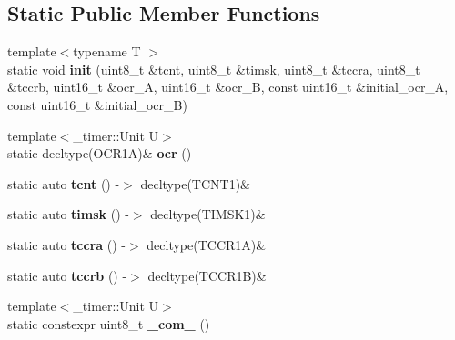 \subsection*{Static Public Member Functions}
\begin{DoxyCompactItemize}
\item 
{\footnotesize template$<$typename T $>$ }\\static void {\bfseries init} (uint8\+\_\+t \&tcnt, uint8\+\_\+t \&timsk, uint8\+\_\+t \&tccra, uint8\+\_\+t \&tccrb, uint16\+\_\+t \&ocr\+\_\+A, uint16\+\_\+t \&ocr\+\_\+B, const uint16\+\_\+t \&initial\+\_\+ocr\+\_\+A, const uint16\+\_\+t \&initial\+\_\+ocr\+\_\+B)\hypertarget{struct__timer1_1_1TimerDef_a3f8c9827b8d6cf2ba3cc058f9755f9c9}{}\label{struct__timer1_1_1TimerDef_a3f8c9827b8d6cf2ba3cc058f9755f9c9}

\item 
{\footnotesize template$<$\+\_\+timer\+::\+Unit U$>$ }\\static decltype(O\+C\+R1A)\& {\bfseries ocr} ()\hypertarget{struct__timer1_1_1TimerDef_af3e2a25d73a3c8af06c8328835a06325}{}\label{struct__timer1_1_1TimerDef_af3e2a25d73a3c8af06c8328835a06325}

\item 
static auto {\bfseries tcnt} () -\/$>$ decltype(T\+C\+N\+T1)\&\hypertarget{struct__timer1_1_1TimerDef_a9ececf0f53fcbf2fedc714c7019b4fba}{}\label{struct__timer1_1_1TimerDef_a9ececf0f53fcbf2fedc714c7019b4fba}

\item 
static auto {\bfseries timsk} () -\/$>$ decltype(T\+I\+M\+S\+K1)\&\hypertarget{struct__timer1_1_1TimerDef_ac82f7a399eb905255b00ea08181c590e}{}\label{struct__timer1_1_1TimerDef_ac82f7a399eb905255b00ea08181c590e}

\item 
static auto {\bfseries tccra} () -\/$>$ decltype(T\+C\+C\+R1A)\&\hypertarget{struct__timer1_1_1TimerDef_ae283398749f8a7aec418c37d7c8db058}{}\label{struct__timer1_1_1TimerDef_ae283398749f8a7aec418c37d7c8db058}

\item 
static auto {\bfseries tccrb} () -\/$>$ decltype(T\+C\+C\+R1B)\&\hypertarget{struct__timer1_1_1TimerDef_ae06bd4363e1e561541b89f5a6792af59}{}\label{struct__timer1_1_1TimerDef_ae06bd4363e1e561541b89f5a6792af59}

\item 
{\footnotesize template$<$\+\_\+timer\+::\+Unit U$>$ }\\static constexpr uint8\+\_\+t {\bfseries \+\_\+com\+\_} ()\hypertarget{struct__timer1_1_1TimerDef_a33ee78373ffe25229c46569c4ef3414e}{}\label{struct__timer1_1_1TimerDef_a33ee78373ffe25229c46569c4ef3414e}


\end{DoxyCompactItemize}
